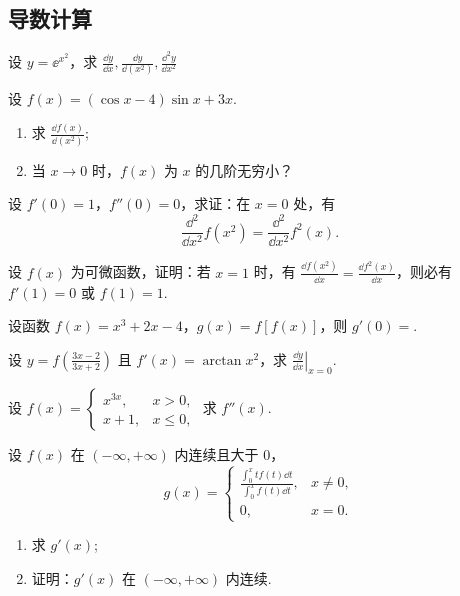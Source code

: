 \subsection{导数计算}
	
	\begin{ti}
		设 $y = \ee^{x^{2}}$，求 $\frac{\dd{y}}{\dd{x}}, \frac{\dd{y}}{\dd{\left( x^{2} \right)}}, \frac{\dd^{2}{y}}{\dd{x^{2}}}$
	\end{ti}

	\begin{ti}
		设 $f(x) = (\cos x - 4)\sin x + 3x$.
		\begin{enumerate}
			\item 求 $\frac{\dd{f(x)}}{\dd{\left( x^{2} \right)}}$;
			\item 当 $x \to 0$ 时，$f(x)$ 为 $x$ 的几阶无穷小？
		\end{enumerate}
	\end{ti}

	\begin{ti}
		设 $f'(0) = 1$，$f''(0) = 0$，求证：在 $x = 0$ 处，有
		\[
			\frac{\dd^{2}}{\dd{x^{2}}} f\left( x^{2} \right) = \frac{\dd^{2}}{\dd{x^{2}}} f^{2}(x).
		\]
	\end{ti}

	\begin{ti}
		设 $f(x)$ 为可微函数，证明：若 $x = 1$ 时，有 $\frac{\dd{f\left( x^{2} \right)}}{\dd{x}} = \frac{\dd{f^{2}(x)}}{\dd{x}}$，则必有 $f'(1) = 0$ 或 $f(1) = 1$.
	\end{ti}
	
	\begin{ti}
		设函数 $f(x) = x^{3} + 2x - 4$，$g(x) = f[f(x)]$，则 $g'(0) =$\htwo.
	\end{ti}

	\begin{ti}
		设 $y = f\left( \frac{3x - 2}{3x + 2} \right)$ 且 $f'(x) = \arctan x^{2}$，求 $\left. \frac{\dd{y}}{\dd{x}} \right|_{x = 0}$.
	\end{ti}

	\begin{ti}
		设 $f(x) = \begin{cases}
			x^{3x}, & x > 0,\\
			x + 1, & x \leq 0,
		\end{cases}$ 求 $f''(x)$.
	\end{ti}

	\begin{ti}
		设 $f(x)$ 在 $(-\infty,+\infty)$ 内连续且大于 $0$，
		\[
			g(x) = \begin{cases}
				\frac{\int_{0}^{x} tf(t) \dd{t}}{\int_{0}^{x} f(t) \dd{t}}, & x \ne 0,\\
				0, & x = 0.
			\end{cases}
		\]
		\begin{enumerate}
			\item 求 $g'(x)$;
			\item 证明：$g'(x)$ 在 $(-\infty,+\infty)$ 内连续.
		\end{enumerate}
	\end{ti}


